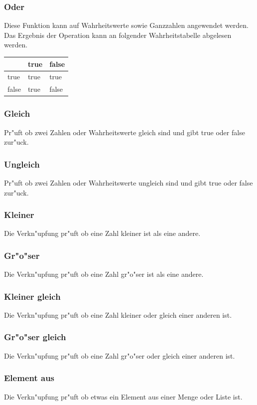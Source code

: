 \documentclass{scrartcl}
\begin{document}
\subsubsection{Oder}
\label{chp:Oder}
Diese Funktion kann auf Wahrheitswerte sowie Ganzzahlen angewendet werden. Das Ergebnis der Operation kann an folgender Wahrheitstabelle abgelesen werden.\newline
\begin{tabular}[b]{|l|l|l|}\hline
 &  true & false \\\hline
true & true & true \\\hline
false & true & false \\\hline
\end{tabular}
\subsubsection{Gleich}
\label{chp:Gleich}
Pr"uft ob zwei Zahlen oder Wahrheitswerte gleich sind und gibt true oder false zur"uck.
\subsubsection{Ungleich}
\label{chp:Ungleich}
Pr"uft ob zwei Zahlen oder Wahrheitswerte ungleich sind und gibt true oder false zur"uck.
\subsubsection{Kleiner}
\label{chp:Kleiner}
Die Verkn"upfung  pr"uft ob eine Zahl kleiner ist als eine andere.
\subsubsection{Gr"o"ser}
\label{chp:Gr"o"ser}
Die Verkn"upfung  pr"uft ob eine Zahl gr"o"ser ist als eine andere.
\subsubsection{Kleiner gleich}
\label{chp:Kleiner_gleich}
Die Verkn"upfung  pr"uft ob eine Zahl kleiner oder gleich einer anderen ist.
\subsubsection{Gr"o"ser gleich}
\label{chp:Gr"o"ser_gleich}
Die Verkn"upfung  pr"uft ob eine Zahl gr"o"ser oder gleich einer anderen ist.
\subsubsection{Element aus}
\label{chp:Element_aus}
Die Verkn"upfung  pr"uft ob etwas ein Element aus einer Menge oder Liste ist.
\end{document}
